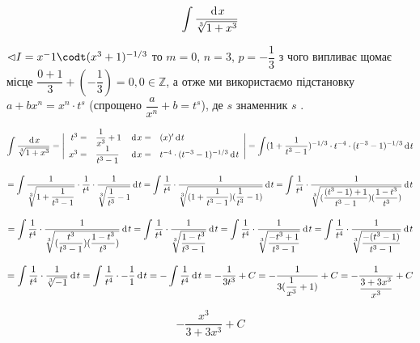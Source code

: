 {}

$$
  \int \dfrac{\hspace{2pt}\text{d}\hspace{1pt}{x}}{\sqrt[3]{1+x^3}}
$$

$\lhd I = x^-1 \codt (x^3+1)^{-1/3}  $ то $m=0$, $n=3$, $p=-\dfrac{1}{3}$ з чого випливає щомає місце $\dfrac{0+1}{3}+(-\dfrac{1}{3}) = 0, 0 \in \mathbb{Z} $, а отже ми використаємо підстановку $a+bx^n = x^n \cdot t^s$ (спрощено $\dfrac{a}{x^n}+b =t^s$), де $s$ знаменник $s$ .

$$
  \int \dfrac{\hspace{2pt}\text{d}\hspace{1pt}{x}}{\sqrt[3]{1+x^3}} =
  \Bigg|
  \begin{array}{rl rl}
    t^3 =&  \dfrac{1}{x^3}+1   & \hspace{2pt}\text{d}\hspace{1pt}{x} = & (x)'\hspace{2pt}\text{d}\hspace{1pt}{t} \\
    x^3 =&  \dfrac{1}{t^3 - 1} & \hspace{2pt}\text{d}\hspace{1pt}{x} = & t^{-4} \cdot (t^{-3}-1)^{-1/3} \hspace{2pt}\text{d}\hspace{1pt}{t}  \\
    \end{array}
  \Bigg| = \int (1+\dfrac{1}{t^3-1})^{-1/3} \cdot t^{-4} \cdot (t^{-3}-1)^{-1/3} \hspace{2pt}\text{d}\hspace{1pt}{t}
$$

$$
= \int \dfrac{1}{\sqrt[3]{1+\dfrac{1}{t^3-1}}} \cdot \dfrac{1}{t^4} \cdot \dfrac{1}{\sqrt[3]{\dfrac{1}{t^3}-1}}  \hspace{2pt}\text{d}\hspace{1pt}{t}
= \int \dfrac{1}{t^4} \cdot \dfrac{1}{\sqrt[3]{(1+\dfrac{1}{t^3-1}) (\dfrac{1}{t^3}-1)}} \hspace{2pt}\text{d}\hspace{1pt}{t}
= \int \dfrac{1}{t^4} \cdot \dfrac{1}{\sqrt[3]{(\dfrac{(t^3-1)+1}{t^3-1}) (\dfrac{1-t^3}{t^3})}} \hspace{2pt}\text{d}\hspace{1pt}{t}
$$

$$
= \int \dfrac{1}{t^4} \cdot \dfrac{1}{\sqrt[3]{(\dfrac{t^3}{t^3-1}) (\dfrac{1-t^3}{t^3})}} \hspace{2pt}\text{d}\hspace{1pt}{t}
= \int \dfrac{1}{t^4} \cdot \dfrac{1}{\sqrt[3]{\dfrac{1-t^3}{t^3-1}}} \hspace{2pt}\text{d}\hspace{1pt}{t}
= \int \dfrac{1}{t^4} \cdot \dfrac{1}{\sqrt[3]{\dfrac{-t^3+1}{t^3-1}}} \hspace{2pt}\text{d}\hspace{1pt}{t}
= \int \dfrac{1}{t^4} \cdot \dfrac{1}{\sqrt[3]{\dfrac{-(t^3-1)}{t^3-1}}} \hspace{2pt}\text{d}\hspace{1pt}{t}
$$

$$
= \int \dfrac{1}{t^4} \cdot \dfrac{1}{\sqrt[3]{-1}} \hspace{2pt}\text{d}\hspace{1pt}{t}
= \int \dfrac{1}{t^4} \cdot - \dfrac{1}{1} \hspace{2pt}\text{d}\hspace{1pt}{t}
= - \int \dfrac{1}{t^4} \hspace{2pt}\text{d}\hspace{1pt}{t}
= - \dfrac{1}{3t^3} + C
= - \dfrac{1}{3(\dfrac{1}{x^3}+1)} + C
= - \dfrac{1}{\dfrac{3+3x^3}{x^3}} + C
$$

$$
\boxed{- \dfrac{x^3}{3+3x^3} + C}
$$
